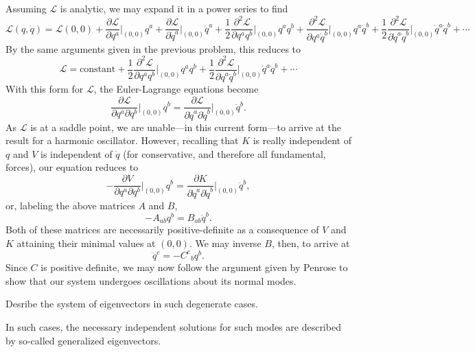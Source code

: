 \documentclass[../road-to-reality.tex]{subfiles}
\begin{document}
\begin{questions}
\begin{solution}
    Assuming $\mathcal{L}$ is analytic, we may expand it in a
    power series to find 
    \[
      \mathcal{L}(q, \dot{q}) = \mathcal{L}(0,0) +
      \frac{\partial\mathcal{L}}{\partial{q^a}}\Big|_{(0,0)}q^a +
      \frac{\partial\mathcal{L}}{\partial{\dot{q}^a}}\Big|_{(0,0)}\dot{q}^a +
      \frac{1}{2}\frac{\partial^2\mathcal{L}}{\partial{q^aq^b}}\Big|_{(0,0)}q^aq^b +
      \frac{\partial^2\mathcal{L}}{\partial{q^a\dot{q}^b}}\Big|_{(0,0)}q^a\dot{q}^b
      +
      \frac{1}{2}\frac{\partial^2\mathcal{L}}{\partial{\dot{q}^a\dot{q}^b}}\Big|_{(0,0)}\dot{q}^a\dot{q}^b
      + \cdots
    \]
    By the same arguments given in the previous problem, this reduces to
    \[
      \mathcal{L} = \text{constant} +
      \frac{1}{2}\frac{\partial^2\mathcal{L}}{\partial{q^aq^b}}\Big|_{(0,0)}q^aq^b
      +
      \frac{1}{2}\frac{\partial^2\mathcal{L}}{\partial{\dot{q}^a\dot{q}^b}}\Big|_{(0,0)}\dot{q}^a\dot{q}^b
      + \cdots 
    \]
    With this form for $\mathcal{L}$, the Euler-Lagrange equations become
    \[
      \frac{\partial\mathcal{L}}{\partial{q}^a\partial{q}^b}\Big|_{(0,0)}q^b
      = \frac{\partial\mathcal{L}}{\partial{\dot{q}}^a\partial{\dot{q}}^b}\Big|_{(0,0)}\ddot{q}^b.
    \]
    As $\mathcal{L}$ is at a saddle point, we are unable---in this current
    form---to arrive at the result for a harmonic oscillator. However, recalling
    that $K$ is really independent of $q$ and $V$ is independent of $\dot{q}$
    (for conservative, and therefore all fundamental, forces), our equation
    reduces to
    \[
      -\frac{\partial{V}}{\partial{q^a}\partial{q^b}}\Big|_{(0,0)}q^b = \frac{\partial{K}}{\partial\dot{q}^a\partial\dot{q}^b}\Big|_{(0,0)}\ddot{q}^b,
    \]
    or, labeling the above matrices $A$ and $B$,
    \[
      -A_{ab}q^b = B_{ab}\ddot{q}^b.
    \]
    Both of these matrices are necessarily positive-definite as a consequence of
    $V$ and $K$ attaining their minimal values at $(0,0)$. We may inverse $B$,
    then, to arrive at
    \[
      \ddot{q}^c = -{C^{c}}_{b}q^b.
    \]
    Since $C$ is positive definite, we may now follow the argument
    given by Penrose to show that our system undergoes oscillations about its
    normal modes.
  \end{solution}

\question Desribe the system of eigenvectors in such degenerate cases.

  \begin{solution}
    In such cases, the necessary independent solutions for such modes are
    described by so-called generalized eigenvectors.
  \end{solution}


\end{questions}
\end{document}
